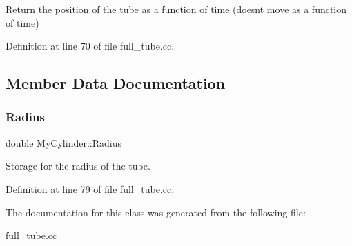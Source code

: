 Return the position of the tube as a function of time (doesn\textquotesingle{}t move as a function of time) 

Definition at line 70 of file full\+\_\+tube.\+cc.



\subsection{Member Data Documentation}
\mbox{\label{classMyCylinder_a3151803ae1fbe1a9858fca37b0f0f20b}} 
\subsubsection{\texorpdfstring{Radius}{Radius}}
{\footnotesize\ttfamily double My\+Cylinder\+::\+Radius\hspace{0.3cm}{\ttfamily [private]}}



Storage for the radius of the tube. 



Definition at line 79 of file full\+\_\+tube.\+cc.



The documentation for this class was generated from the following file\+:\begin{DoxyCompactItemize}
\item 
\hyperlink{full__tube_8cc}{full\+\_\+tube.\+cc}\end{DoxyCompactItemize}
